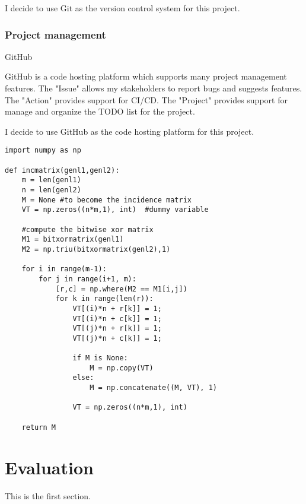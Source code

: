 \documentclass{report}
\begin{document}
I decide to use Git as the version control system for this project.

\subsection{Project management}

GitHub

GitHub is a code hosting platform which supports many project management features. The "Issue" allows my stakeholders to report bugs and suggests features. The "Action" provides support for CI/CD. The "Project" provides support for manage and organize the TODO list for the project.

I decide to use GitHub as the code hosting platform for this project.

\begin{verbatim}
import numpy as np
    
def incmatrix(genl1,genl2):
    m = len(genl1)
    n = len(genl2)
    M = None #to become the incidence matrix
    VT = np.zeros((n*m,1), int)  #dummy variable
    
    #compute the bitwise xor matrix
    M1 = bitxormatrix(genl1)
    M2 = np.triu(bitxormatrix(genl2),1) 

    for i in range(m-1):
        for j in range(i+1, m):
            [r,c] = np.where(M2 == M1[i,j])
            for k in range(len(r)):
                VT[(i)*n + r[k]] = 1;
                VT[(i)*n + c[k]] = 1;
                VT[(j)*n + r[k]] = 1;
                VT[(j)*n + c[k]] = 1;
                
                if M is None:
                    M = np.copy(VT)
                else:
                    M = np.concatenate((M, VT), 1)
                
                VT = np.zeros((n*m,1), int)
    
    return M
\end{verbatim}

\chapter{Evaluation}

This is the first section.
\end{document}
